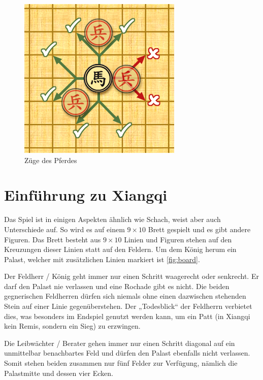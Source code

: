 \documentclass{jpp}
\begin{document}
\begin{figure}
\begin{minipage}{0.49\textwidth}
    \includegraphics[width=\textwidth]{imgs/MovementOfHorsePiece.png}
    \caption{Züge des Pferdes}
    \label{fig:Horse}
  \end{minipage}
\end{figure}
\section{Einführung zu Xiangqi}\label{sec:introtoxiangqi}
Das Spiel ist in einigen Aspekten ähnlich wie Schach, weist aber auch Unterschiede auf. So wird es auf einem $9 \times 10$ Brett gespielt und es gibt andere Figuren.
Das Brett besteht aus $9 \times 10$ Linien und Figuren stehen auf den Kreuzungen dieser Linien statt auf den Feldern. Um dem König herum ein Palast, welcher mit zusätzlichen Linien markiert ist \ref{fig:board}.


Der Feldherr / König geht immer nur einen Schritt waagerecht oder senkrecht. Er darf den Palast nie verlassen und eine Rochade gibt es nicht. Die beiden gegnerischen Feldherren dürfen sich niemals ohne einen dazwischen stehenden Stein auf einer Linie gegenüberstehen. Der „Todesblick“ der Feldherrn verbietet dies, was besonders im Endspiel genutzt werden kann, um ein Patt (in Xiangqi kein Remis, sondern ein Sieg) zu erzwingen.

Die Leibwächter / Berater gehen immer nur einen Schritt diagonal auf ein unmittelbar benachbartes Feld und dürfen den Palast ebenfalls nicht verlassen. Somit stehen beiden zusammen nur fünf Felder zur Verfügung, nämlich die Palastmitte und dessen vier Ecken.
\end{document}
